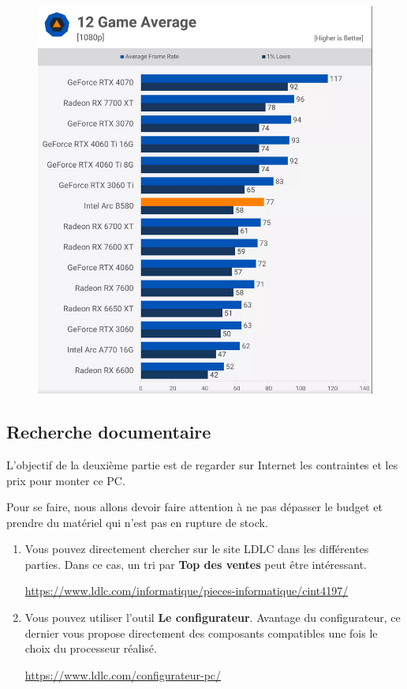 \begin{multicols}{2}
\begin{figure}[H]
  \centering
  \includegraphics[width=0.9\linewidth]{4xDM/gpu.png}
\end{figure}
\end{multicols}


\subsection*{Recherche documentaire}

L'objectif de la deuxième partie est de regarder sur Internet les contraintes et les prix pour monter ce PC.

Pour se faire, nous allons devoir faire attention à ne pas dépasser le budget et prendre du matériel qui n'est pas en rupture de stock. 

\begin{enumerate}
  \item[1.] Vous pouvez directement chercher sur le site LDLC dans les différentes parties. Dans ce cas, un tri par \textbf{Top des ventes} peut être intéressant. 
  
  \url{https://www.ldlc.com/informatique/pieces-informatique/cint4197/} \\
  
   \item[2.] Vous pouvez utiliser l'outil \textbf{Le configurateur}.   Avantage du configurateur, ce dernier vous propose directement des composants compatibles une fois le choix du processeur réalisé. 
  
  \url{https://www.ldlc.com/configurateur-pc/}

\end{enumerate}

